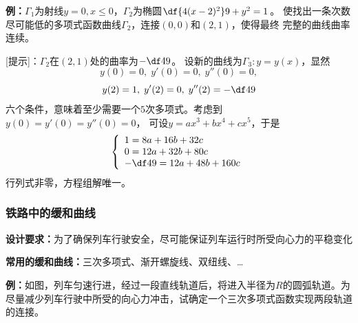 {\bf 例：}$\Gamma_1$为射线$y=0,x\leq0$，$\Gamma_2$为椭圆$\df{4(x-2)^2}9+y^2=1$。
使找出一条次数尽可能低的多项式函数曲线$\Gamma_2$，连接$(0,0)$和$(2,1)$，使得最终
完整的曲线曲率连续。

[提示]：$\Gamma_2$在$(2,1)$处的曲率为$-\df49$。
设新的曲线为$\Gamma_3:y=y(x)$，显然
$$y(0)=0,\;y'(0)=0,\;y''(0)=0,$$
$$y(2)=1,\;y'(2)=0,\;y''(2)=-\df49$$
六个条件，意味着至少需要一个$5$次多项式。考虑到$y(0)=y'(0)=y''(0)=0$，
可设$y=ax^3+bx^4+cx^5$，于是
$$
\left\{
\begin{array}{l}
1=8a+16b+32c\\
0=12a+32b+80c\\
-\df49=12a+48b+160c
\end{array}
\right.
$$
行列式非零，方程组解唯一。

\subsubsection{铁路中的缓和曲线}

\begin{center}
\end{center}

{\bf 设计要求：}为了确保列车行驶安全，尽可能保证列车运行时所受向心力的平稳变化

{\bf 常用的缓和曲线：}三次多项式、渐开螺旋线、双纽线、\ldots

{\bf 例：}如图，列车匀速行进，经过一段直线轨道后，将进入半径为$R$的圆弧轨道。为
尽量减少列车行驶中所受的向心力冲击，试确定一个三次多项式函数实现两段轨道的连接。

